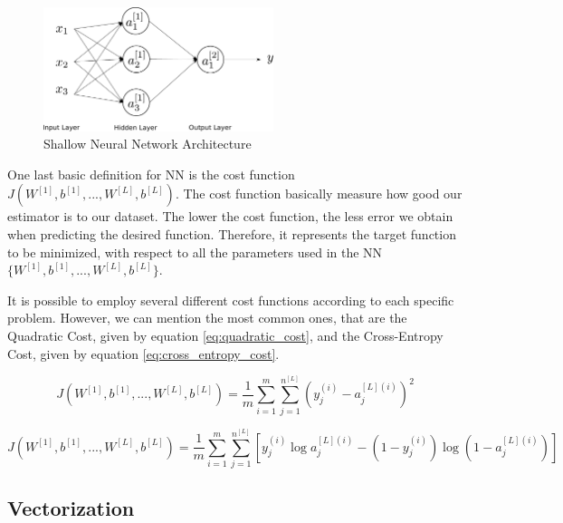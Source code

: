 \begin{figure}[H]
    \centering
    \includegraphics[width=0.6\textwidth]{Chapter4/neuralnet.pdf}
    \caption{Shallow Neural Network Architecture}
    \label{fig:nn_basic_architecture}
\end{figure}

One last basic definition for NN is the cost function $J(W^{[1]},b^{[1]},...,W^{[L]},b^{[L]})$. The cost function basically measure how good our estimator is to our dataset. The lower the cost function, the less error we obtain when predicting the desired function. Therefore, it represents the target function to be minimized, with respect to all the parameters used in the NN $\{ W^{[1]},b^{[1]},...,W^{[L]},b^{[L]} \}$.

It is possible to employ several different cost functions according to each specific problem. However, we can mention the most common ones, that are the Quadratic Cost, given by equation \ref{eq:quadratic_cost}, and the Cross-Entropy Cost, given by equation \ref{eq:cross_entropy_cost}.

\begin{equation}
J(W^{[1]},b^{[1]},...,W^{[L]},b^{[L]}) = \frac{1}{m} \sum_{i=1}^{m}{\sum_{j=1}^{n^{[L]}}{ (y_j^{(i)} - a_j^{[L](i)})^2 }}
\label{eq:quadratic_cost}
\end{equation}

\begin{equation}
J(W^{[1]},b^{[1]},...,W^{[L]},b^{[L]}) = \frac{1}{m} \sum_{i=1}^{m}{\sum_{j=1}^{n^{[L]}}{ \left[ y_j^{(i)}\log{a_j^{[L](i)}} - (1-y_j^{(i)}) \log{ (1 - a_j^{[L](i)}) } \right] }}
\label{eq:cross_entropy_cost}
\end{equation}


\subsection{Vectorization}

